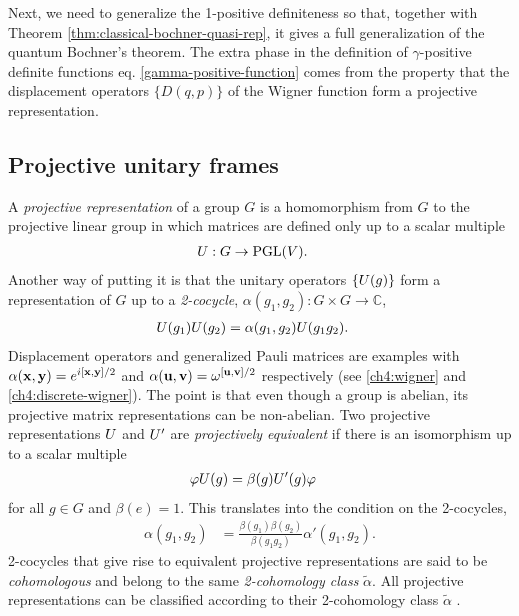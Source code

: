 Next, we need to generalize the 1-positive definiteness so that, together with Theorem \ref{thm:classical-bochner-quasi-rep}, it gives a full generalization of the quantum Bochner's theorem. The extra phase in the definition of $\gamma$-positive definite functions eq. \eqref{gamma-positive-function} comes from the property that the displacement operators $\{ D(q,p) \}$ of the Wigner function form a projective representation.

\subsection{Projective unitary frames}

A \emph{projective representation} of a group $G$ is a homomorphism from $G$ to the projective linear group in which matrices are defined only up to a scalar multiple
\begin{align}
	U:G &\to \text{PGL}(V).
\end{align}
Another way of putting it is that the unitary operators $\{ U(g) \}$ form a representation of $G$ up to a
\emph{2-cocycle}, $\alpha(g_1,g_2):G\times G\to\mathbb{C}$,
\begin{align}
U(g_1)U(g_2) & =\alpha(g_1,g_2)U(g_1g_2).
\end{align}
Displacement operators and generalized Pauli matrices are examples with $\alpha({\bf x,y}) = e^{i[{\bf x,y}]/2}$ and $\alpha({\bf u,v}) = \omega^{[{\bf u,v}]/2}$ respectively (see \autoref{ch4:wigner} and \autoref{ch4:discrete-wigner}). The point is that even though a group is abelian, its projective matrix representations can be non-abelian. Two projective representations $U$ and $U'$ are \emph{projectively equivalent} if there is an isomorphism up to a scalar multiple
\begin{align}
\varphi U(g) & =\beta(g) U'(g) \varphi
\end{align}
for all $g \in G$ and $\beta(e)=1$. This translates into the condition on the 2-cocycles,
\begin{align}
\alpha(g_1,g_2) &= \frac{\beta(g_1) \beta(g_2)}{\beta(g_1g_2)} \alpha'(g_1,g_2). \label{eq:cohomologous}
\end{align}
2-cocycles that give rise to equivalent projective representations are said to be \emph{cohomologous} and belong to the same \emph{2-cohomology class} $\tilde{\alpha}$. All projective representations can be classified according to their 2-cohomology class $\tilde{\alpha}$ \cite{Karpilovsky2,Karpilovsky3}.

